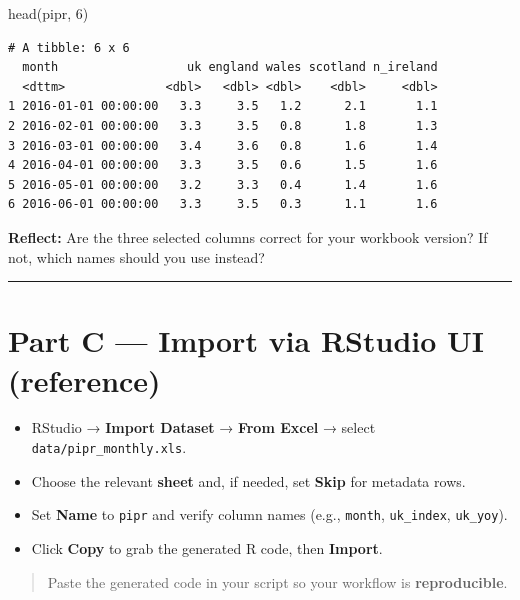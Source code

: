 \documentclass[
  letterpaper,
  DIV=11,
  numbers=noendperiod]{scrreprt}
\newenvironment{Shaded}{\begin{snugshade}}{\end{snugshade}}
\newcommand{\DecValTok}[1]{\textcolor[rgb]{0.68,0.00,0.00}{#1}}
\newcommand{\FunctionTok}[1]{\textcolor[rgb]{0.28,0.35,0.67}{#1}}
\newcommand{\NormalTok}[1]{\textcolor[rgb]{0.00,0.23,0.31}{#1}}
\providecommand{\tightlist}{%
  \setlength{\itemsep}{0pt}\setlength{\parskip}{0pt}}
\begin{document}
\begin{Shaded}
\begin{Highlighting}[]
\FunctionTok{head}\NormalTok{(pipr, }\DecValTok{6}\NormalTok{)}
\end{Highlighting}
\end{Shaded}

\begin{verbatim}
# A tibble: 6 x 6
  month                  uk england wales scotland n_ireland
  <dttm>              <dbl>   <dbl> <dbl>    <dbl>     <dbl>
1 2016-01-01 00:00:00   3.3     3.5   1.2      2.1       1.1
2 2016-02-01 00:00:00   3.3     3.5   0.8      1.8       1.3
3 2016-03-01 00:00:00   3.4     3.6   0.8      1.6       1.4
4 2016-04-01 00:00:00   3.3     3.5   0.6      1.5       1.6
5 2016-05-01 00:00:00   3.2     3.3   0.4      1.4       1.6
6 2016-06-01 00:00:00   3.3     3.5   0.3      1.1       1.6
\end{verbatim}

\textbf{Reflect:} Are the three selected columns correct for your
workbook version? If not, which names should you use instead?

\begin{center}\rule{0.5\linewidth}{0.5pt}\end{center}

\section{Part C --- Import via RStudio UI
(reference)}\label{part-c-import-via-rstudio-ui-reference}

\begin{itemize}
\tightlist
\item
  RStudio → \textbf{Import Dataset} → \textbf{From Excel} → select
  \texttt{data/pipr\_monthly.xls}.
\item
  Choose the relevant \textbf{sheet} and, if needed, set \textbf{Skip}
  for metadata rows.
\item
  Set \textbf{Name} to \texttt{pipr} and verify column names (e.g.,
  \texttt{month}, \texttt{uk\_index}, \texttt{uk\_yoy}).
\item
  Click \textbf{Copy} to grab the generated R code, then
  \textbf{Import}.
\end{itemize}

\begin{quote}
Paste the generated code in your script so your workflow is
\textbf{reproducible}.
\end{quote}
\end{document}
